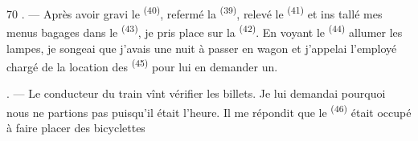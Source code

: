 \begin{VUpage}[72]{70}
. --- Après avoir gravi le \textsuperscript{(40)},\nl
refermé la \textsuperscript{(39)}, relevé le \textsuperscript{(41)} et ins\cc
tallé mes menus bagages dans le \textsuperscript{(43)}, je pris\nl
place sur la \textsuperscript{(42)}. En voyant le \textsuperscript{(44)}\nl
allumer les lampes, je songeai que j'avais une nuit à\nl
passer en wagon et j'appelai l'employé chargé de la\nl
location des \textsuperscript{(45)} pour lui en demander un.

. --- Le conducteur du train vînt vérifier les\nl
billets. Je lui demandai pourquoi nous ne partions pas\nl
puisqu'il était l'heure. Il me répondit que le \nl
{}\textsuperscript{(46)} était occupé à faire placer des bicyclettes
\parplein
\end{VUpage}

